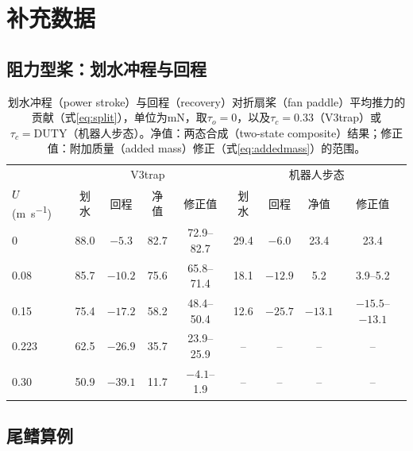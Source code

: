\chapter{补充数据}
\label{app:data}

\section{阻力型桨：划水冲程与回程}
\label{app:drag-split}

\begin{table}[H]
  \centering
  \caption[划水冲程与回程的贡献]{划水冲程（power stroke）与回程（recovery）对折扇桨（fan paddle）平均推力的贡献（式\eqref{eq:split}），单位为\si{\milli\newton}，取$\tau_o=0$，以及$\tau_c=0.33$（V3trap）或$\tau_c=\mathrm{DUTY}$（机器人步态）。净值：两态合成（two-state composite）结果；修正值：附加质量（added mass）修正（式\eqref{eq:addedmass}）的范围。}
  \label{tab:app-split}
  \footnotesize
  \begin{tabular}{@{}lcccc|cccc@{}}
    \toprule
    & \multicolumn{4}{c|}{V3trap} & \multicolumn{4}{c}{机器人步态} \\
    $U$ (\si{\metre\per\second}) & 划水 & 回程 & 净值 & 修正值 & 划水 & 回程 & 净值 & 修正值 \\
    \midrule
    0     & 88.0 & $-5.3$  & 82.7 & 72.9--82.7 & 29.4 & $-6.0$  & 23.4    & 23.4 \\
    0.08  & 85.7 & $-10.2$ & 75.6 & 65.8--71.4 & 18.1 & $-12.9$ & 5.2     & 3.9--5.2 \\
    0.15  & 75.4 & $-17.2$ & 58.2 & 48.4--50.4 & 12.6 & $-25.7$ & $-13.1$ & $-15.5$--$-13.1$ \\
    0.223 & 62.5 & $-26.9$ & 35.7 & 23.9--25.9 & --   & --      & --      & -- \\
    0.30  & 50.9 & $-39.1$ & 11.7 & $-4.1$--1.9 & --  & --      & --      & -- \\
    \bottomrule
  \end{tabular}
\end{table}

\section{尾鳍算例}
\label{app:fluke}

